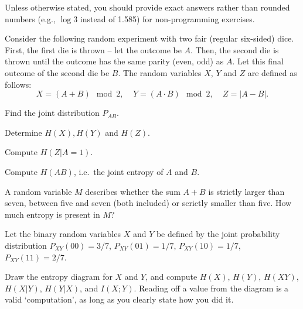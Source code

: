 \documentclass[a4paper,10pt,landscape,twocolumn]{scrartcl}
\begin{document}
\homeworkproblems

Unless otherwise stated, you should provide exact answers rather than rounded numbers (e.g., $\log 3$ instead of 1.585) for non-programming exercises.

\begin{exercise}
Consider the following random experiment with two fair (regular six-sided) dice. First, the first die is thrown -- let the outcome be $A$. Then, the second die is thrown until the outcome has the same parity (even, odd) as $A$. Let this final outcome of the second die be $B$. The random variables $X$, $Y$ and $Z$ are defined as follows:
\[
X = (A + B) \mod 2, \ \ \ \ \ Y = (A \cdot B) \mod 2, \ \ \ \ \ Z = |A - B|.
\]
	\begin{subex}[(1pt)]
	Find the joint distribution $P_{AB}$.
	\end{subex}
	\begin{subex}[(1pt)]
	Determine $H(X), H(Y)$ and $H(Z)$.
	\end{subex}
	\begin{subex}[(1pt)]
	Compute $H(Z|A=1)$.
	\end{subex}
	\begin{subex}[(1pt)]
	Compute $H(AB)$, i.e.\ the joint entropy of $A$ and $B$.
	\end{subex}
	\begin{subex}[(2pt)]
	A random variable $M$ describes whether the sum $A + B$ is strictly larger than seven, between five and seven (both included) or scrictly smaller than five. How much entropy is present in $M$?
	\end{subex}
\end{exercise}

\begin{exercise}
Let the binary random variables $X$ and $Y$ be defined by the joint probability distribution $P_{XY}(00) = 3/7$, $P_{XY}(01) = 1/7$, $P_{XY}(10) = 1/7$, $P_{XY}(11) = 2/7$.

Draw the entropy diagram for $X$ and $Y$, and compute $H(X)$, $H(Y)$, $H(XY)$, $H(X|Y)$, $H(Y|X)$, and $I(X;Y)$. Reading off a value from the diagram is a valid `computation', as long as you clearly state how you did it.
\begin{center}
\end{center}
\end{exercise}
\end{document}
